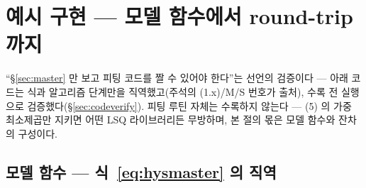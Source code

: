 \documentclass[11pt,a4paper]{article}
\begin{document}
\section{예시 구현 — 모델 함수에서 round-trip 까지}\label{sec:code}
``\S\ref{sec:master} 만 보고 피팅 코드를 짤 수 있어야 한다''는 선언의 검증이다 — 아래 코드는 식과 알고리즘 단계만을 직역했고(주석의 (1.x)/M/S 번호가 출처), 수록 전 실행으로 검증했다(\S\ref{sec:codeverify}). 피팅 루틴 자체는 수록하지 않는다 — (5) 의 가중 최소제곱만 지키면 어떤 LSQ 라이브러리든 무방하며, 본 절의 몫은 모델 함수와 잔차의 구성이다.

\subsection{모델 함수 — 식~\eqref{eq:hysmaster} 의 직역}\label{sec:codemodel}
\end{document}
